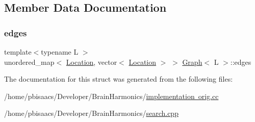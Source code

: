 \subsection{Member Data Documentation}
\mbox{\label{structGraph_a8b01818e086835dc5d24ec4082afeef0}} 
\subsubsection{\texorpdfstring{edges}{edges}}
{\footnotesize\ttfamily template$<$typename L $>$ \\
unordered\+\_\+map$<$ \mbox{\hyperlink{structGraph_aea7d42bb67163fe692353674435a1426}{Location}}, vector$<$ \mbox{\hyperlink{structGraph_aea7d42bb67163fe692353674435a1426}{Location}} $>$ $>$ \mbox{\hyperlink{structGraph}{Graph}}$<$ L $>$\+::edges}



The documentation for this struct was generated from the following files\+:\begin{DoxyCompactItemize}
\item 
/home/pbisaacs/\+Developer/\+Brain\+Harmonics/\mbox{\hyperlink{implementation_01orig_8cc}{implementation orig.\+cc}}\item 
/home/pbisaacs/\+Developer/\+Brain\+Harmonics/\mbox{\hyperlink{search_8cpp}{search.\+cpp}}\end{DoxyCompactItemize}
